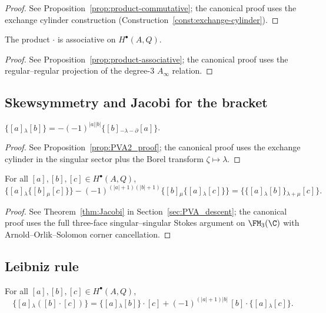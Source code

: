 \begin{proof}
See Proposition~\ref{prop:product-commutative}; the canonical proof uses the
exchange cylinder construction (Construction~\ref{const:exchange-cylinder}).
\end{proof}

\begin{theorem}
\label{thm:assoc}
The product $\cdot$ is associative on $H^\bullet(A,Q)$.
\end{theorem}

\begin{proof}
See Proposition~\ref{prop:product-associative}; the canonical proof uses
the regular--regular projection of the degree-$3$ $A_\infty$ relation.
\end{proof}

\subsection{Skewsymmetry and Jacobi for the bracket}
\label{subsec:skew-Jacobi}
\begin{proposition}[Skewsymmetry]
\label{prop:skewsym}
$\{[a]{}_\lambda [b]\} =
-(-1)^{|a||b|}\{[b]{}_{-\lambda-\partial} [a]\}$.
\end{proposition}

\begin{proof}
See Proposition~\ref{prop:PVA2_proof}; the canonical proof uses the
exchange cylinder in the singular sector plus the Borel transform
$\zeta\mapsto\lambda$.
\end{proof}

\begin{theorem}
\label{thm:Jacobi-PVA}
\label{thm:Jacobi-bv}
For all $[a],[b],[c]\in H^\bullet(A,Q)$,
\[
\{[a]{}_\lambda \{[b]{}_\mu [c]\}\} - (-1)^{(|a|+1)(|b|+1)} \{[b]{}_\mu \{[a]{}_\lambda [c]\}\} = \{\{[a]{}_\lambda [b]\}{}_{\lambda+\mu} [c]\}.
\]
\end{theorem}

\begin{proof}
See Theorem~\ref{thm:Jacobi} in Section~\ref{sec:PVA_descent}; the
canonical proof uses the full three-face singular--singular Stokes
argument on $\FM_3(\C)$ with Arnold--Orlik--Solomon corner cancellation.
\end{proof}

\subsection{Leibniz rule}
\label{subsec:Leibniz}
\begin{theorem}
\label{thm:Leibniz-PVA}
\label{thm:Leibniz-bv}
For all $[a],[b],[c]\in H^\bullet(A,Q)$,
\[
\{[a]{}_\lambda ([b]\cdot [c])\} = \{[a]{}_\lambda [b]\}\cdot [c] + (-1)^{(|a|+1)|b|}\,[b]\cdot \{[a]{}_\lambda [c]\}.
\]
\end{theorem}

